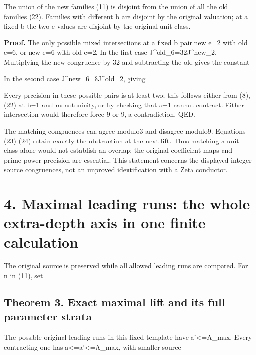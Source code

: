 The union of the new families (11) is disjoint from the union of all the
old families (22). Families with different b are disjoint by the
original valuation; at a fixed b the two e values are disjoint by the
original unit class.

\textbf{Proof.} The only possible mixed intersections at a fixed b pair
new e=2 with old e=6, or new e=6 with old e=2. In the first case
J\^{}old\_6=32J\^{}new\_2. Multiplying the new congruence by 32 and
subtracting the old gives the constant


In the second case J\^{}new\_6=8J\^{}old\_2, giving


Every precision in these possible pairs is at least two; this follows
either from (8),(22) at b=1 and monotonicity, or by checking that a=1
cannot contract. Either intersection would therefore force 9
or 9, a contradiction. QED.

The matching congruences can agree modulo3 and disagree modulo9.
Equations (23)-(24) retain exactly the obstruction at the next lift.
Thus matching a unit class alone would not establish an overlap; the
original coefficient maps and prime-power precision are essential. This
statement concerns the displayed integer source congruences, not an
unproved identification with a Zeta conductor.

\section{4. Maximal leading runs: the whole extra-depth axis in one
finite calculation}

The original source is preserved while all allowed leading runs are
compared. For n in (11), set


\subsection{Theorem 3. Exact maximal lift and its full parameter strata}

The possible original leading runs in this fixed template have
a'\textless=A\_max. Every contracting one has
a\textless=a'\textless=A\_max, with smaller source


